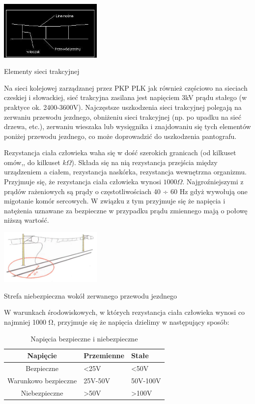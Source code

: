 \begin{marginfigure}
	\includegraphics[width=5cm]{skryptkierownik-img/siec-jezdna.jpg}
	\caption{Elementy sieci trakcyjnej}
\end{marginfigure}
Na sieci kolejowej zarządzanej przez PKP PLK jak również częściowo na sieciach czeskiej i słowackiej, sieć trakcyjna zasilana jest napięciem 3kV prądu stałego (w praktyce ok. 2400-3600V). Najczęstsze uszkodzenia sieci trakcyjnej polegają na zerwaniu przewodu jezdnego, obniżeniu sieci trakcyjnej (np. po upadku na sieć drzewa, etc.), zerwaniu wieszaka lub wysięgnika i znajdowaniu się tych elementów poniżej przewodu jezdnego, co może doprowadzić do uszkodzenia pantografu.

Rezystancja ciała człowieka waha się w dość szerokich granicach (od kilkuset omów,, do kilkuset $k\Omega$). Składa się na nią rezystancja przejścia między urządzeniem a ciałem, rezystancja naskórka, rezystancja wewnętrzna organizmu. Przyjmuje się, że rezystancja ciała człowieka wynosi $1000\Omega$. Najgroźniejszymi z prądów rażeniowych są prądy o częstotliwościach 40 ÷ 60 Hz gdyż wywołują one migotanie komór sercowych. W związku z tym przyjmuje się że napięcia i natężenia uznawane za bezpieczne w przypadku prądu zmiennego mają o połowę niższą wartość.
\begin{marginfigure}
	\includegraphics[width=5cm]{skryptkierownik-img/strefa-niebezpieczna-trakcja-10.jpg}
	\caption{Strefa niebezpieczna wokół zerwanego przewodu jezdnego}
	\label{fig:przewod}
\end{marginfigure}
W warunkach środowiskowych, w których rezystancja ciała człowieka wynosi co najmniej 1000 Ω, przyjmuje się że napięcia dzielimy w następujący sposób:
\begin{table}
	\begin{tabular}{|c|m{2.5cm}|m{2.5cm}|}
		\hline
		Napięcie&Przemienne& Stałe\\
		\hline
		Bezpieczne &<25V &<50V\\
		\hline
		Warunkowo bezpieczne &25V-50V &50V-100V\\
		\hline
		Niebezpieczne	&>50V	&>100V\\
		\hline
	\end{tabular}
	\caption{Napięcia bezpieczne i niebezpieczne}
\end{table}


